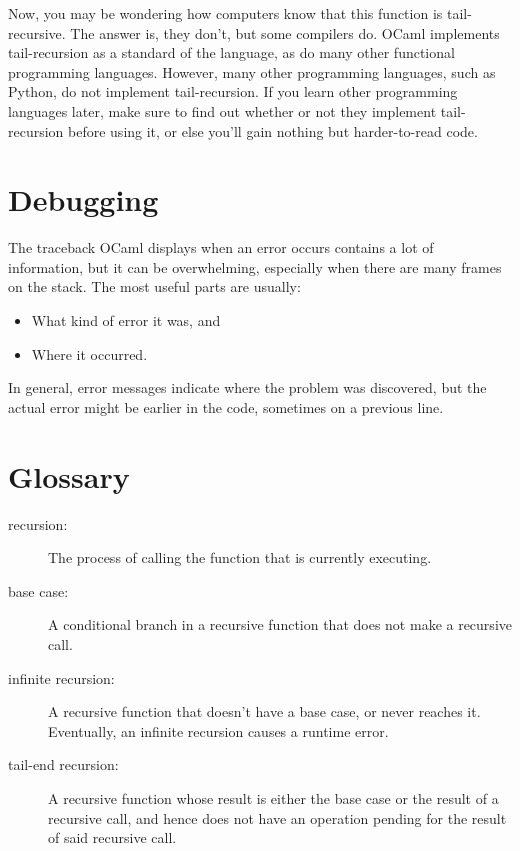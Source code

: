 \documentclass[10pt]{book}
\begin{document}
Now, you may be wondering how computers know that this function is tail-recursive.
The answer is, they don't, but some compilers do. OCaml implements tail-recursion 
as a standard of the language, as do many other functional programming languages. 
However, many other programming languages, such as Python, do not implement 
tail-recursion. If you learn other programming languages later, make sure to find 
out whether or not they implement tail-recursion before using it, or else you'll 
gain nothing but harder-to-read code.

\section{Debugging}
\label{whitespace}
The traceback OCaml displays when an error occurs contains
a lot of information, but it can be overwhelming, especially
when there are many frames on the stack.  The most
useful parts are usually:

\begin{itemize}

\item What kind of error it was, and

\item Where it occurred.

\end{itemize}

In general, error messages indicate where the problem was
discovered, but the actual error might be earlier in the code,
sometimes on a previous line.

\section{Glossary}

\begin{description}

\item[recursion:]  The process of calling the function that is
currently executing.

\item[base case:]  A conditional branch in a
recursive function that does not make a recursive call.

\item[infinite recursion:]  A recursive function that doesn't have a
base case, or never reaches it.  Eventually, an infinite recursion
causes a runtime error.

\item[tail-end recursion:] A recursive function whose result is either 
the base case or the result of a recursive call, and hence does not have
an operation pending for the result of said recursive call.

\end{description}
\end{document}
